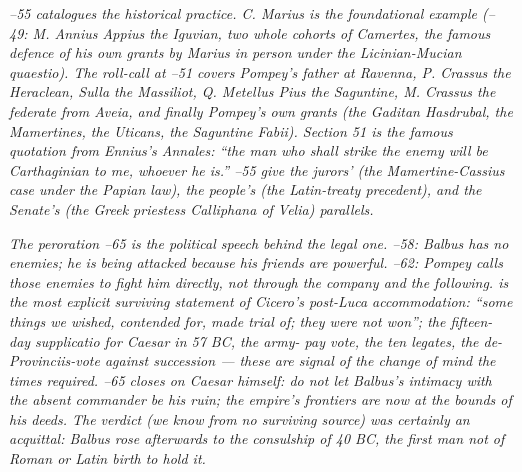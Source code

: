\textit{--55 catalogues the historical
practice. C. Marius is the foundational example
(--49: M. Annius Appius the Iguvian, two
whole cohorts of Camertes, the famous defence of his
own grants by Marius in person under the Licinian-Mucian
quaestio). The roll-call at --51 covers
Pompey's father at Ravenna, P. Crassus the Heraclean,
Sulla the Massiliot, Q. Metellus Pius the Saguntine, M.
Crassus the federate from Aveia, and finally Pompey's
own grants (the Gaditan Hasdrubal, the Mamertines, the
Uticans, the Saguntine Fabii). Section 51 is the famous
quotation from Ennius's \textit{Annales}: ``\textit{the
man who shall strike the enemy will be Carthaginian to
me, whoever he is.}'' --55 give the
jurors' (the Mamertine-Cassius case under the Papian
law), the people's (the Latin-treaty precedent), and
the Senate's (the Greek priestess Calliphana of Velia)
parallels.}

\textit{The peroration --65 is the
political speech behind the legal one. --58: Balbus has no enemies; he is being attacked
because his friends are powerful. --62:
Pompey calls those enemies to fight him directly, not
through the company and the following. 
is the most explicit surviving statement of Cicero's
post-Luca accommodation: ``some things we wished,
contended for, made trial of; they were not won''; the
fifteen-day supplicatio for Caesar in 57 BC, the army-
pay vote, the ten legates, the de-Provinciis-vote against
succession --- these are signal of the change of mind
the times required. --65 closes on
Caesar himself: do not let Balbus's intimacy with the
absent commander be his ruin; the empire's frontiers
are now at the bounds of his deeds. The verdict (we know
from no surviving source) was certainly an acquittal:
Balbus rose afterwards to the consulship of 40 BC, the
first man not of Roman or Latin birth to hold it.}
